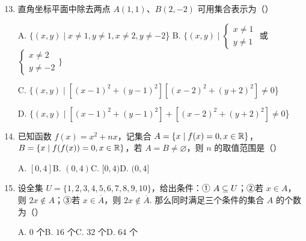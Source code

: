 \documentclass[a4paper,11pt]{article}
\begin{document}

\begin{enumerate}
\setcounter{enumi}{12}

\item 直角坐标平面中除去两点 $A(1,1)$、$B(2,-2)$ 可用集合表示为\mbox{（\quad）}

\keepwithprev
A. $\{(x,y)\mid x\neq1,y\neq1,x\neq2,y\neq-2$\}\qquad
B. $\{(x,y)\mid\begin{cases}x\neq1\\ y\neq1\end{cases}$ 或 $\begin{cases}x\neq2\\ y\neq-2\end{cases}\}$

C. $\{(x,y)\mid[(x-1)^2+(y-1)^2][(x-2)^2+(y+2)^2]\neq0$\}

D. $\{(x,y)\mid[(x-1)^2+(y-1)^2]+[(x-2)^2+(y+2)^2]\neq0$\}


\item 已知函数 $f(x)=x^2+nx$，记集合 $A=\{x\mid f(x)=0,x\in\mathbb{R}\}$，
$B=\{x\mid f(f(x))=0,x\in\mathbb{R}\}$，若 $A=B\neq\varnothing$，则 $n$ 的取值范围是\mbox{（\quad）}

\keepwithprev
A. $[0,4]$\qquad B. $(0,4)$\qquad C. $[0,4)$\qquad D. $(0,4]$


\ifanswer
\solbegin
{}
\step{综上所述，$n$ 的取值范围是 $[0,4)$. 故选 $C$.}
\solend

\fi

\item 设全集 $U=\{1,2,3,4,5,6,7,8,9,10\}$，给出条件：① $A\subseteq U$；②若 $x\in A$，
则 $2x\notin A$；③若 $x\in\overline{A}$，则 $2x\notin\overline{A}$.
那么同时满足三个条件的集合 $A$ 的个数为\mbox{（\quad）}

\keepwithprev
A. $0$ 个\qquad B. $16$ 个\qquad C. $32$ 个\qquad D. $64$ 个


\ifanswer
\solbegin
{}
\solend


\end{enumerate}
\end{document}
